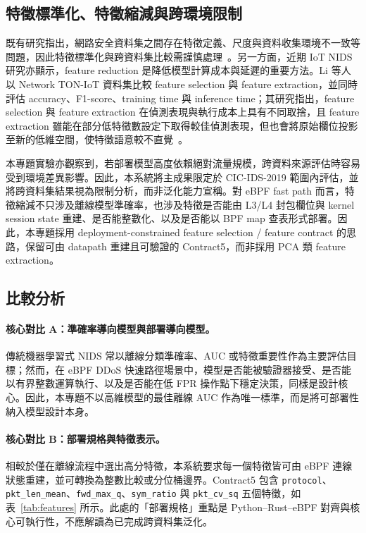 \documentclass[12pt, a4paper, fontset=none]{ctexart}
\newcommand{\code}[1]{\texttt{#1}}
\begin{document}
\subsection{特徵標準化、特徵縮減與跨環境限制}
既有研究指出，網路安全資料集之間存在特徵定義、尺度與資料收集環境不一致等問題，因此特徵標準化與跨資料集比較需謹慎處理~\cite{moyano2023feature}。另一方面，近期 IoT NIDS 研究亦顯示，feature reduction 是降低模型計算成本與延遲的重要方法。Li 等人以 Network TON-IoT 資料集比較 feature selection 與 feature extraction，並同時評估 accuracy、F1-score、training time 與 inference time；其研究指出，feature selection 與 feature extraction 在偵測表現與執行成本上具有不同取捨，且 feature extraction 雖能在部分低特徵數設定下取得較佳偵測表現，但也會將原始欄位投影至新的低維空間，使特徵語意較不直覺~\cite{li2024featureReduction}。

本專題實驗亦觀察到，若部署模型高度依賴絕對流量規模，跨資料來源評估時容易受到環境差異影響。因此，本系統將主成果限定於 CIC-IDS-2019 範圍內評估，並將跨資料集結果視為限制分析，而非泛化能力宣稱。對 eBPF fast path 而言，特徵縮減不只涉及離線模型準確率，也涉及特徵是否能由 L3/L4 封包欄位與 kernel session state 重建、是否能整數化、以及是否能以 BPF map 查表形式部署。因此，本專題採用 deployment-constrained feature selection / feature contract 的思路，保留可由 datapath 重建且可驗證的 Contract5，而非採用 PCA 類 feature extraction。

\subsection{比較分析}
\paragraph{核心對比 A：準確率導向模型與部署導向模型。}
傳統機器學習式 NIDS 常以離線分類準確率、AUC 或特徵重要性作為主要評估目標；然而，在 eBPF DDoS 快速路徑場景中，模型是否能被驗證器接受、是否能以有界整數運算執行、以及是否能在低 FPR 操作點下穩定決策，同樣是設計核心。因此，本專題不以高維模型的最佳離線 AUC 作為唯一標準，而是將可部署性納入模型設計本身。

\paragraph{核心對比 B：部署規格與特徵表示。}
相較於僅在離線流程中選出高分特徵，本系統要求每一個特徵皆可由 eBPF 連線狀態重建，並可轉換為整數比較或分位桶邊界。Contract5 包含 \code{protocol}、\code{pkt\_len\_mean}、\code{fwd\_max\_q}、\code{sym\_ratio} 與 \code{pkt\_cv\_sq} 五個特徵，如表~\ref{tab:features} 所示。此處的「部署規格」重點是 Python--Rust--eBPF 對齊與核心可執行性，不應解讀為已完成跨資料集泛化。
\end{document}
